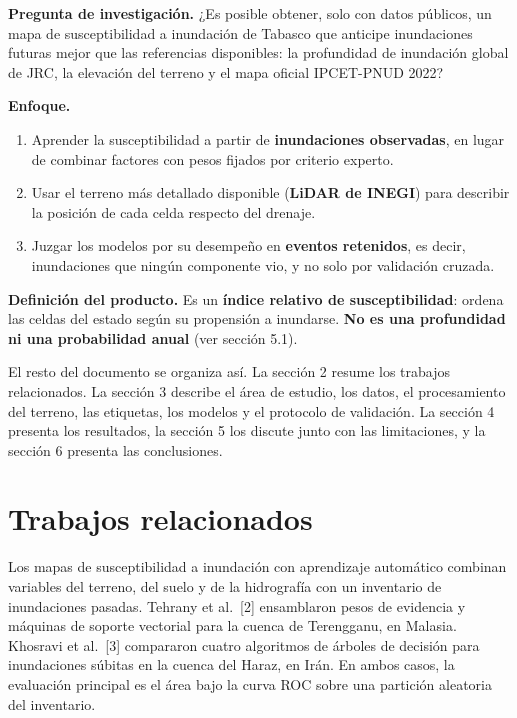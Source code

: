 \textbf{Pregunta de investigación.} ¿Es posible obtener, solo con datos públicos, un mapa de susceptibilidad a inundación de Tabasco que anticipe inundaciones futuras mejor que las referencias disponibles: la profundidad de inundación global de JRC, la elevación del terreno y el mapa oficial IPCET-PNUD 2022?

\textbf{Enfoque.}

\begin{enumerate}
\def\labelenumi{\arabic{enumi}.}
\tightlist
\item
  Aprender la susceptibilidad a partir de \textbf{inundaciones observadas}, en lugar de combinar factores con pesos fijados por criterio experto.
\item
  Usar el terreno más detallado disponible (\textbf{LiDAR de INEGI}) para describir la posición de cada celda respecto del drenaje.
\item
  Juzgar los modelos por su desempeño en \textbf{eventos retenidos}, es decir, inundaciones que ningún componente vio, y no solo por validación cruzada.
\end{enumerate}

\textbf{Definición del producto.} Es un \textbf{índice relativo de susceptibilidad}: ordena las celdas del estado según su propensión a inundarse. \textbf{No es una profundidad ni una probabilidad anual} (ver sección 5.1).

El resto del documento se organiza así. La sección 2 resume los trabajos relacionados. La sección 3 describe el área de estudio, los datos, el procesamiento del terreno, las etiquetas, los modelos y el protocolo de validación. La sección 4 presenta los resultados, la sección 5 los discute junto con las limitaciones, y la sección 6 presenta las conclusiones.

\section{Trabajos relacionados}

Los mapas de susceptibilidad a inundación con aprendizaje automático combinan variables del terreno, del suelo y de la hidrografía con un inventario de inundaciones pasadas. Tehrany et al.~{[}2{]} ensamblaron pesos de evidencia y máquinas de soporte vectorial para la cuenca de Terengganu, en Malasia. Khosravi et al.~{[}3{]} compararon cuatro algoritmos de árboles de decisión para inundaciones súbitas en la cuenca del Haraz, en Irán. En ambos casos, la evaluación principal es el área bajo la curva ROC sobre una partición aleatoria del inventario.

